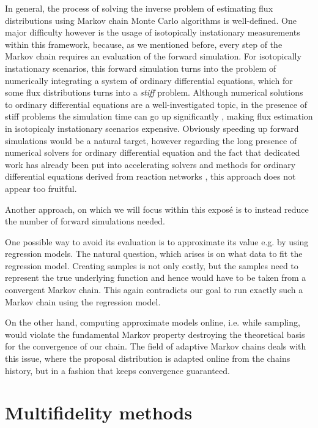\documentclass[10pt]{article}
\newcommand{\todo}[1]{{\color{red}#1}}
\begin{document}
In general, the process of solving the inverse problem of estimating flux distributions using Markov chain Monte Carlo
algorithms is well-defined.
One major difficulty however is the usage of isotopically instationary measurements within this framework, 
because, as we mentioned before, every step of the Markov chain requires an evaluation of the forward simulation.
For isotopically instationary scenarios, this forward simulation turns into the problem of numerically integrating 
a system of ordinary differential equations, which for some flux distributions turns into a \emph{stiff} problem.
Although numerical solutions to ordinary differential equations are a well-investigated topic, in the presence of stiff
problems the simulation time can go up significantly \todo{\cite{?}}, making flux estimation in isotopicaly instationary
scenarios expensive.
Obviously speeding up forward simulations would be a natural target, however regarding the long presence of 
numerical solvers for ordinary differential equation and the fact that dedicated work has already been put into
accelerating solvers and methods for ordinary differential equations derived from reaction networks \cite{stratmann19},
this approach does not appear too fruitful.

Another approach, on which we will focus within this expos\'e is to instead reduce the number of forward simulations needed.

\bigskip
\noindent \todo{from here on still very much a draft}
\bigskip

One possible way to avoid its evaluation is to approximate its value e.g. by using regression
models. 
The natural question, which arises is on what data to fit the regression model.
Creating samples is not only costly, but the samples need to represent the true underlying function
and hence would have to be taken from a convergent Markov chain.
This again contradicts our goal to run exactly such a Markov chain using the regression model.

On the other hand, computing approximate models online, i.e. while sampling, would violate the fundamental Markov property
destroying the theoretical basis for the convergence of our chain.
The field of adaptive Markov chains deals with this issue, where the proposal distribution is adapted online
from the chains history, but in a fashion that keeps convergence guaranteed.


\section{Multifidelity methods}
\label{sec:multifidelity}
\end{document}

